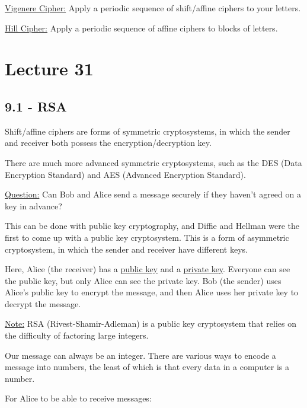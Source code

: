 \documentclass{article}
\begin{document}
\underline{Vigenere Cipher:} Apply a periodic sequence of shift/affine ciphers to your letters. 

\underline{Hill Cipher:} Apply a periodic sequence of affine ciphers to blocks of letters.

\section{Lecture 31}

\subsection{9.1 - RSA}

Shift/affine ciphers are forms of symmetric cryptosystems, in which the sender and receiver both possess the encryption/decryption key. 

There are much more advanced symmetric cryptosystems, such as the DES (Data Encryption Standard) and AES (Advanced Encryption Standard).

\underline{Question:} Can Bob and Alice send a message securely if they haven't agreed on a key in advance?

This can be done with public key cryptography, and Diffie and Hellman were the first to come up with a public key cryptosystem. This is a form of asymmetric cryptosystem, in which the sender and receiver have different keys.

Here, Alice (the receiver) has a \underline{public key} and a \underline{private key}. Everyone can see the public key, but only Alice can see the private key. Bob (the sender) uses Alice's public key to encrypt the message, and then Alice uses her private key to decrypt the message.

\underline{Note:} RSA (Rivest-Shamir-Adleman) is a public key cryptosystem that relies on the difficulty of factoring large integers.

Our message can always be an integer. There are various ways to encode a message into numbers, the least of which is that every data in a computer is a number.

For Alice to be able to receive messages: 
\end{document}
